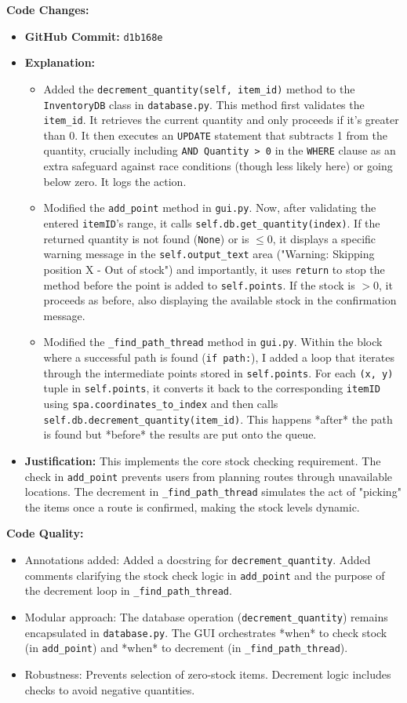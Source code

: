 \textbf{Code Changes:}
\begin{itemize}
	\item \textbf{GitHub Commit:} \verb|d1b168e|
	\item \textbf{Explanation:}
	\begin{itemize}
		\item Added the \verb|decrement_quantity(self, item_id)| method to the \verb|InventoryDB| class in \verb|database.py|. This method first validates the \verb|item_id|. It retrieves the current quantity and only proceeds if it's greater than 0. It then executes an \verb|UPDATE| statement that subtracts 1 from the quantity, crucially including \verb|AND Quantity > 0| in the \verb|WHERE| clause as an extra safeguard against race conditions (though less likely here) or going below zero. It logs the action.
		\item Modified the \verb|add_point| method in \verb|gui.py|. Now, after validating the entered \verb|itemID|'s range, it calls \verb|self.db.get_quantity(index)|. If the returned quantity is not found (\verb|None|) or is $\le 0$, it displays a specific warning message in the \verb|self.output_text| area ("Warning: Skipping position X - Out of stock") and importantly, it uses \verb|return| to stop the method before the point is added to \verb|self.points|. If the stock is $>0$, it proceeds as before, also displaying the available stock in the confirmation message.
		\item Modified the \verb|_find_path_thread| method in \verb|gui.py|. Within the block where a successful path is found (\verb|if path:|), I added a loop that iterates through the intermediate points stored in \verb|self.points|. For each \verb|(x, y)| tuple in \verb|self.points|, it converts it back to the corresponding \verb|itemID| using \verb|spa.coordinates_to_index| and then calls \verb|self.db.decrement_quantity(item_id)|. This happens *after* the path is found but *before* the results are put onto the queue.
	\end{itemize}
	\item \textbf{Justification:} This implements the core stock checking requirement. The check in \verb|add_point| prevents users from planning routes through unavailable locations. The decrement in \verb|_find_path_thread| simulates the act of "picking" the items once a route is confirmed, making the stock levels dynamic.
\end{itemize}

\textbf{Code Quality:}
\begin{itemize}
	\item Annotations added: Added a docstring for \verb|decrement_quantity|. Added comments clarifying the stock check logic in \verb|add_point| and the purpose of the decrement loop in \verb|_find_path_thread|.
	\item Modular approach: The database operation (\verb|decrement_quantity|) remains encapsulated in \verb|database.py|. The GUI orchestrates *when* to check stock (in \verb|add_point|) and *when* to decrement (in \verb|_find_path_thread|).
	\item Robustness: Prevents selection of zero-stock items. Decrement logic includes checks to avoid negative quantities.
\end{itemize}

